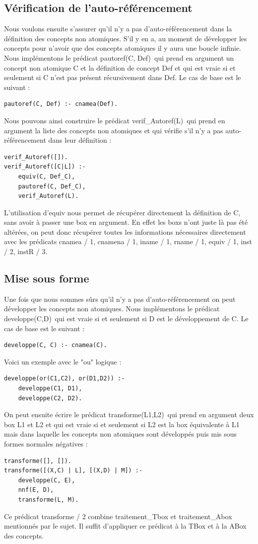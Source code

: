 \documentclass{article}
\begin{document}
\subsection{Vérification de l'auto-référencement}
Nous voulons ensuite s'assurer qu'il n'y a pas d'auto-référencement dans la définition des concepts non atomiques. S'il y en a, au moment de développer les concepts pour n'avoir que des concepts atomiques il y aura une boucle infinie. Nous implémentons le prédicat \color{blue}pautoref(C, Def)\color{black}\ qui prend en argument un concept non atomique C et la définition de concept Def et qui est vraie si et seulement si C n'est pas présent récursivement dans Def. Le cas de base est le suivant :
\begin{verbatim}
pautoref(C, Def) :- cnamea(Def).
\end{verbatim}

Nous pouvons ainsi construire le prédicat \color{blue}verif\_Autoref(L)\color{black}\ qui prend en argument la liste des concepts non atomiques et qui vérifie s'il n'y a pas auto-référencement dans leur définition : 
\begin{verbatim}
verif_Autoref([]).
verif_Autoref([C|L]) :-
	equiv(C, Def_C),
	pautoref(C, Def_C),
	verif_Autoref(L).
\end{verbatim}
L'utilisation d'equiv nous permet de récupérer directement la définition de C, sans avoir à passer une box en argument. En effet les boxs n'ont juste là pas été altérées, on peut donc récupérer toutes les informations nécessaires directement avec les prédicats  \color{blue}cnamea / 1, cnamena / 1, iname / 1, rname / 1, equiv / 1, inst / 2, instR / 3\color{black}.

\subsection{Mise sous forme}
Une fois que nous sommes sûrs qu'il n'y a pas d'auto-référencement on peut développer les concepts non atomiques. Nous implémentons le prédicat \color{blue}developpe(C,D)\color{black}\ qui est vraie si et seulement si D est le développement de C. Le cas de base est le suivant : 
\begin{verbatim}
developpe(C, C) :- cnamea(C).
\end{verbatim}
Voici un exemple avec le "ou" logique :
\begin{verbatim}
developpe(or(C1,C2), or(D1,D2)) :- 
	developpe(C1, D1), 
	developpe(C2, D2).
\end{verbatim}
On peut ensuite écrire le prédicat \color{blue}transforme(L1,L2)\color{black}\ qui prend en argument deux box L1 et L2 et qui est vraie si et seulement si L2 est la box équivalente à L1 mais dans laquelle les concepts non atomiques sont développés puis mis sous formes normales négatives :
\begin{verbatim}
transforme([], []).
transforme([(X,C) | L], [(X,D) | M]) :- 
	developpe(C, E),
	nnf(E, D),
	transforme(L, M).
\end{verbatim}
Ce prédicat \color{blue} transforme / 2 \color{black} combine \color{blue} traitement\_Tbox \color{black} et \color{blue} traitement\_Abox \color{black} mentionnés par le sujet. Il suffit d'appliquer ce prédicat à la TBox et à la ABox des concepts.
\end{document}
